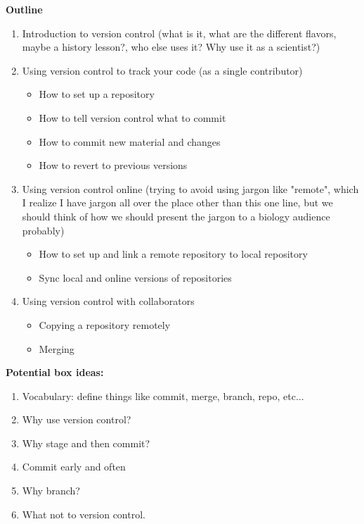 \textbf{Outline}

\begin{enumerate}
  \item Introduction to version control (what is it, what are the different flavors, maybe a history lesson?, who else uses it? Why use it as a scientist?)
  \item Using version control to track your code (as a single contributor)
  \begin{itemize}
    \item How to set up a repository
    \item How to tell version control what to commit
    \item How to commit new material and changes
    \item How to revert to previous versions
  \end{itemize}
  \item Using version control online (trying to avoid using jargon like "remote", which I realize I have jargon all over the place other than this one line, but we should think of how we should present the jargon to a biology audience probably)
  \begin{itemize}
    \item How to set up and link a remote repository to local repository
    \item Sync local and online versions of repositories
  \end{itemize}
  \item Using version control with collaborators
    \begin{itemize}
      \item Copying a repository remotely
      \item Merging
  \end{itemize}
\end{enumerate}



\textbf{Potential box ideas:}
\begin{enumerate}
  \item Vocabulary: define things like commit, merge, branch, repo, etc...
  \item Why use version control?
  \item Why stage and then commit?
  \item Commit early and often
  \item Why branch?
  \item What not to version control.
\end{enumerate}